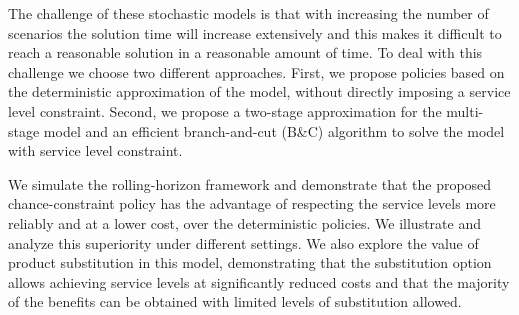 \documentclass[11pt]{article}
\begin{document}
The challenge of these stochastic models is that with increasing the number of scenarios the solution time will increase extensively and this makes it difficult to reach a reasonable solution in a reasonable amount of time. To deal with this challenge we choose two different approaches. First, we propose policies based on the deterministic approximation of the model, without directly imposing a service level constraint. Second, we propose a two-stage approximation for the multi-stage model and an efficient branch-and-cut (B\&C) algorithm to solve the model with service level constraint.

We simulate the rolling-horizon framework and demonstrate that the proposed chance-constraint policy has the advantage of respecting the service levels more reliably and at a lower cost, over the deterministic policies. We illustrate and analyze this superiority under different settings. We also explore the value of product substitution in this model, demonstrating that the substitution option allows achieving service levels at significantly reduced costs and that the majority of the benefits can be obtained with limited levels of substitution allowed.
\end{document}
